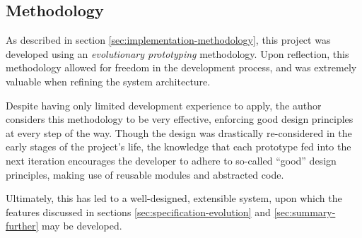 \newpage

\subsection{Methodology}

As described in section \ref{sec:implementation-methodology}, this project was
developed using an \emph{evolutionary prototyping} methodology. Upon
reflection, this methodology allowed for freedom in the development process,
and was extremely valuable when refining the system architecture.

Despite having only limited development experience to apply, the author
considers this methodology to be very effective, enforcing good design
principles at every step of the way. Though the design was drastically
re-considered in the early stages of the project's life, the knowledge that
each prototype fed into the next iteration encourages the developer to adhere
to so-called ``good'' design principles, making use of reusable modules and
abstracted code.

Ultimately, this has led to a well-designed, extensible system, upon which the
features discussed in sections \ref{sec:specification-evolution} and
\ref{sec:summary-further} may be developed.
